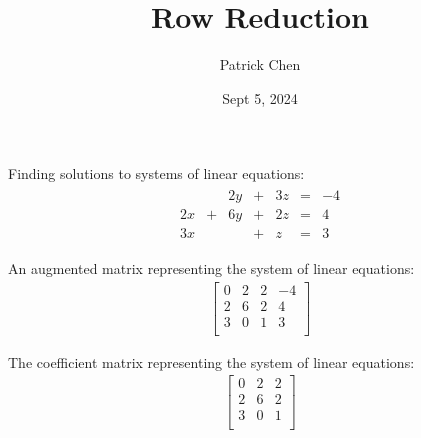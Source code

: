 \documentclass{article}
\title{Row Reduction}
\author{Patrick Chen}
\date{Sept 5, 2024}
\theoremstyle{mytheoremstyle}
\theoremstyle{mytheoremstyle}
\theoremstyle{myproblemstyle}
\begin{document}
    \maketitle

    Finding solutions to systems of linear equations:
    \begin{align*}
        \begin{matrix}
               & & 2y &+& 3z &=& -4 \\
            2x &+& 6y &+& 2z &=& 4 \\
            3x & &    &+& z  &=& 3
        \end{matrix}
    \end{align*}

    An augmented matrix representing the system of linear equations:
    \begin{align*}
        \begin{bmatrix}
            0 & 2 & 2 & -4 \\
            2 & 6 & 2 & 4 \\
            3 & 0 & 1 & 3 \\
        \end{bmatrix}
    \end{align*}

    The coefficient matrix representing the system of linear equations:
    \begin{align*}
        \begin{bmatrix}
            0 & 2 & 2  \\
            2 & 6 & 2  \\
            3 & 0 & 1  \\
        \end{bmatrix}
    \end{align*}
\end{document}
